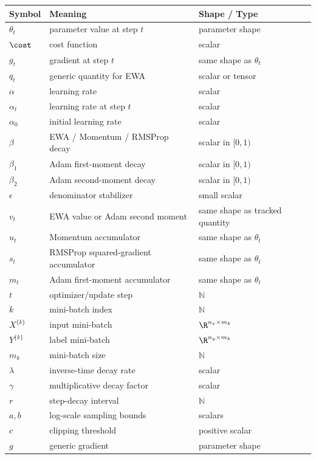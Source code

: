\begin{center}
\begin{tabular}{lll}
\toprule
Symbol & Meaning & Shape / Type \\
\midrule
$\theta_t$ & parameter value at step $t$ & parameter shape \\
$\cost$ & cost function & scalar \\
$g_t$ & gradient at step $t$ & same shape as $\theta_t$ \\
$q_t$ & generic quantity for EWA & scalar or tensor \\
$\alpha$ & learning rate & scalar \\
$\alpha_t$ & learning rate at step $t$ & scalar \\
$\alpha_0$ & initial learning rate & scalar \\
$\beta$ & EWA / Momentum / RMSProp decay & scalar in $[0,1)$ \\
$\beta_1$ & Adam first-moment decay & scalar in $[0,1)$ \\
$\beta_2$ & Adam second-moment decay & scalar in $[0,1)$ \\
$\epsilon$ & denominator stabilizer & small scalar \\
$v_t$ & EWA value or Adam second moment & same shape as tracked quantity \\
$u_t$ & Momentum accumulator & same shape as $\theta_t$ \\
$s_t$ & RMSProp squared-gradient accumulator & same shape as $\theta_t$ \\
$m_t$ & Adam first-moment accumulator & same shape as $\theta_t$ \\
$t$ & optimizer/update step & $\mathbb{N}$ \\
$k$ & mini-batch index & $\mathbb{N}$ \\
$X^{\{k\}}$ & input mini-batch & $\R^{n_x \times m_k}$ \\
$Y^{\{k\}}$ & label mini-batch & $\R^{n_y \times m_k}$ \\
$m_k$ & mini-batch size & $\mathbb{N}$ \\
$\lambda$ & inverse-time decay rate & scalar \\
$\gamma$ & multiplicative decay factor & scalar \\
$r$ & step-decay interval & $\mathbb{N}$ \\
$a,b$ & log-scale sampling bounds & scalars \\
$c$ & clipping threshold & positive scalar \\
$g$ & generic gradient & parameter shape \\
\bottomrule
\end{tabular}
\end{center}
